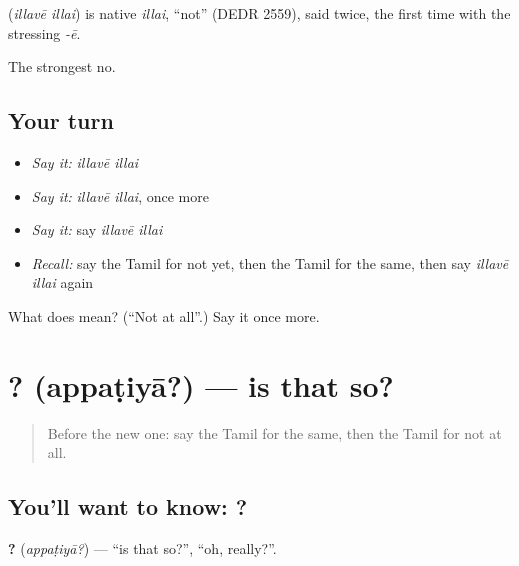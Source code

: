 \begin{cousinweb}
\textbf{ } (\emph{illavē illai}) is native \emph{illai}, \textquotedblleft{}not\textquotedblright{} (DEDR 2559), said twice, the first time with the stressing \emph{-ē}.
\end{cousinweb}

\begin{grammarlens}[title={What you've built}]
The strongest no.
\end{grammarlens}

\subsection*{Your turn}
\begin{itemize}
\raggedright
  \item \emph{Say it:} \emph{illavē illai}
  \item \emph{Say it:} \emph{illavē illai}, once more
  \item \emph{Say it:} say \emph{illavē illai}
  \item \emph{Recall:} say the Tamil for not yet, then the Tamil for the same, then say \emph{illavē illai} again
\end{itemize}

\begin{tcolorbox}[breakable,colback=teal!4,colframe=teal!35!black,title={Before you move on}]
What does   mean? (\textquotedblleft{}Not at all\textquotedblright{}.) Say it once more.
\end{tcolorbox}
\section[\texorpdfstring{\ta{அப்படியா}? (appaṭiyā?)}{அப்படியா? (appaṭiyā?)}]{? (appaṭiyā?) — is that so?}

\label{lesson:TA-C96-isthatso}



\begin{quote}
Before the new one: say the Tamil for the same, then the Tamil for not at all.
\end{quote}

\subsection*{You'll want to know: ?}
\textbf{?} (\emph{appaṭiyā?}) — \textquotedblleft{}is that so?\textquotedblright{}, \textquotedblleft{}oh, really?\textquotedblright{}.

